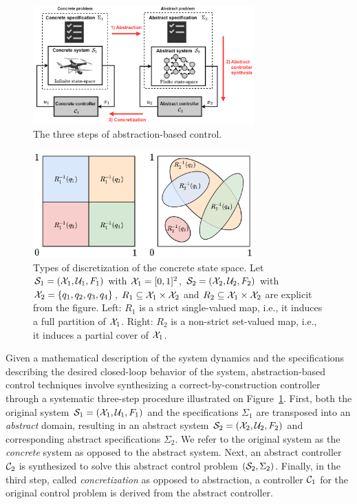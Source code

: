 \documentclass{juliacon}
\begin{document}
\begin{figure}[t]
\centerline{\includegraphics[width=8.5cm]{Figures/Abstraction/Abstraction-based control.png}}
\caption{The three steps of abstraction-based control.}
	\label{fig:abstraction-procedure}
\end{figure}

\begin{figure}[t]
\centerline{\includegraphics[width=8.5cm]{Figures/Abstraction/strict-cover-partition.png}}
\caption{Types of discretization of the concrete state space.
    Let $\mathcal{S}_{1} = (\mathcal{X}_1,\mathcal{U}_1,F_1)$ with $\mathcal{X}_1 = [0,1]^2$, $\mathcal{S}_{2} = (\mathcal{X}_2,\mathcal{U}_2,F_2)$ with $\mathcal{X}_2 = \{q_1,q_2,q_3,q_4\}$, $R_1 \subseteq \mathcal{X}_1\times \mathcal{X}_2$ and $R_2 \subseteq \mathcal{X}_1\times \mathcal{X}_2$ are explicit from the figure.
    Left: $R_1$ is a strict single-valued map, i.e., it induces a full partition of $\mathcal{X}_1$. Right: $R_2$ is a non-strict set-valued map, i.e., it induces a partial cover of $\mathcal{X}_1$.}
	\label{fig:discretization}
\end{figure}

Given a mathematical description of the system dynamics and the specifications describing the desired closed-loop behavior of the system, abstraction-based control techniques involve synthesizing a correct-by-construction controller through a systematic three-step procedure illustrated on Figure~\ref{fig:abstraction-procedure}. 
First, both the original system $\mathcal{S}_1=(\mathcal{X}_1,\mathcal{U}_1,F_1)$ and the specifications $\Sigma_1$ are transposed into an \emph{abstract} domain, resulting in an abstract system $\mathcal{S}_2=(\mathcal{X}_2,\mathcal{U}_2,F_2)$ and corresponding abstract specifications $\Sigma_2$. We refer to the original system as the \emph{concrete} system as opposed to the abstract system. 
Next, an abstract controller $\mathcal{C}_2$ is synthesized to solve this abstract control problem $(\mathcal{S}_2,\Sigma_2)$. 
Finally, in the third step, called \emph{concretization} as opposed to abstraction, a controller $\mathcal{C}_1$ for the original control problem is derived from the abstract controller.
\end{document}
